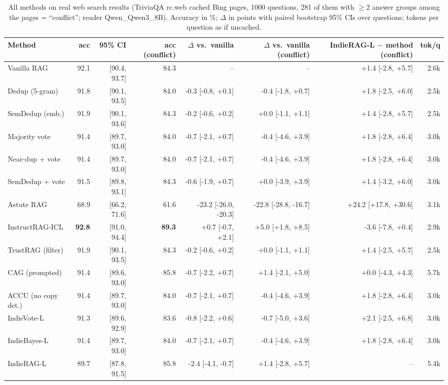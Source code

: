 \begin{table}[tbp]
\centering
\small
\caption{All methods on real web search results (TriviaQA rc.web cached Bing pages, 1000 questions, 281 of them with $\geq$2 answer groups among the pages = ``conflict''; reader Qwen\_Qwen3\_8B). Accuracy in \%; $\Delta$ in points with paired bootstrap 95\% CIs over questions; tokens per question as if uncached.}
\label{tab:webmethods:Qwen_Qwen3_8B}
\setlength{\tabcolsep}{4pt}
\begin{tabular}{lrrrrrrr}
\toprule
Method & acc & 95\% CI & acc (conflict) & $\Delta$ vs.\ vanilla & $\Delta$ vs.\ vanilla (conflict) & IndieRAG-L $-$ method (conflict) & tok/q \\
\midrule
Vanilla RAG & 92.1 & [90.4, 93.7] & 84.3 & -- & -- & +1.4 [-2.8, +5.7] & 2.6k \\
Dedup (5-gram) & 91.8 & [90.1, 93.5] & 84.0 & -0.3 [-0.8, +0.1] & -0.4 [-1.8, +0.7] & +1.8 [-2.5, +6.0] & 2.5k \\
SemDedup (emb.) & 91.9 & [90.1, 93.6] & 84.3 & -0.2 [-0.6, +0.2] & +0.0 [-1.1, +1.1] & +1.4 [-2.8, +5.7] & 2.5k \\
Majority vote & 91.4 & [89.7, 93.0] & 84.0 & -0.7 [-2.1, +0.7] & -0.4 [-4.6, +3.9] & +1.8 [-2.8, +6.4] & 3.0k \\
Near-dup + vote & 91.4 & [89.7, 93.0] & 84.0 & -0.7 [-2.1, +0.7] & -0.4 [-4.6, +3.9] & +1.8 [-2.8, +6.4] & 3.0k \\
SemDedup + vote & 91.5 & [89.8, 93.1] & 84.3 & -0.6 [-1.9, +0.7] & +0.0 [-3.9, +3.9] & +1.4 [-3.2, +6.0] & 3.0k \\
Astute RAG & 68.9 & [66.2, 71.6] & 61.6 & -23.2 [-26.0, -20.3] & -22.8 [-28.8, -16.7] & +24.2 [+17.8, +30.6] & 3.1k \\
InstructRAG-ICL & \textbf{92.8} & [91.0, 94.4] & \textbf{89.3} & +0.7 [-0.7, +2.1] & +5.0 [+1.8, +8.5] & -3.6 [-7.8, +0.4] & 2.9k \\
TrustRAG (filter) & 91.9 & [90.1, 93.5] & 84.3 & -0.2 [-0.6, +0.2] & +0.0 [-1.1, +1.1] & +1.4 [-2.5, +5.7] & 2.5k \\
CAG (prompted) & 91.4 & [89.6, 93.0] & 85.8 & -0.7 [-2.2, +0.7] & +1.4 [-2.1, +5.0] & +0.0 [-4.3, +4.3] & 5.7k \\
ACCU (no copy det.) & 91.4 & [89.7, 93.0] & 84.0 & -0.7 [-2.1, +0.7] & -0.4 [-4.6, +3.9] & +1.8 [-2.8, +6.4] & 3.0k \\
\midrule
IndieVote-L & 91.3 & [89.6, 92.9] & 83.6 & -0.8 [-2.2, +0.6] & -0.7 [-5.0, +3.6] & +2.1 [-2.5, +6.8] & 3.0k \\
IndieBayes-L & 91.4 & [89.7, 93.0] & 84.0 & -0.7 [-2.1, +0.7] & -0.4 [-4.6, +3.9] & +1.8 [-2.8, +6.4] & 3.0k \\
IndieRAG-L & 89.7 & [87.8, 91.5] & 85.8 & -2.4 [-4.1, -0.7] & +1.4 [-2.8, +5.7] & -- & 5.4k \\
\bottomrule
\end{tabular}
\end{table}
